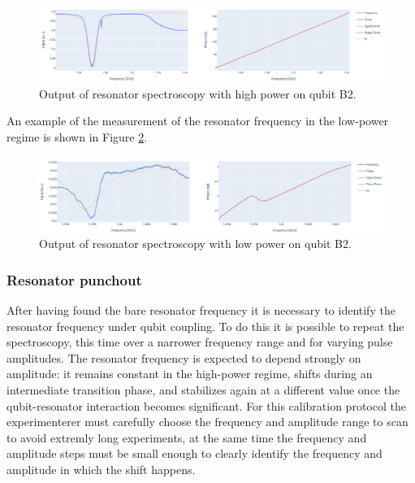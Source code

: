 \begin{figure}[h!]
    \centering
    \includegraphics[width=\textwidth]{figures/png/res_spectroscopy_high.png}
    \caption{Output of resonator spectroscopy with high power on qubit B2.}
    \label{fig:res_high}
\end{figure}

An example of the measurement of the resonator frequency in the low-power regime is shown in Figure \ref{fig:res_low}.

\begin{figure}[h!]
    \centering
    \includegraphics[width=\textwidth]{figures/png/res_low.png}
    \caption{Output of resonator spectroscopy with low power on qubit B2.}
    \label{fig:res_low}
\end{figure}


\subsubsection{Resonator punchout}
After having found the bare resonator frequency it is necessary to identify the resonator frequency under qubit coupling. 
To do this it is possible to repeat the spectroscopy, this time over a narrower frequency range and for varying pulse amplitudes. 
The resonator frequency is expected to depend strongly on amplitude: it remains constant in the high-power regime, shifts during an intermediate transition phase, and stabilizes again at a different value once the qubit-resonator interaction becomes significant.
For this calibration protocol the experimenterer must carefully choose the frequency and amplitude range to scan to avoid extremly long experiments, at the same time the frequency and amplitude steps must be small enough to clearly identify the frequency and amplitude in which the shift happens.   

